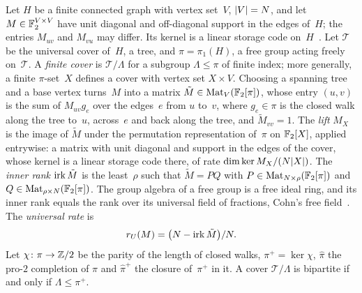 Let $H$ be a finite connected graph with vertex set~$V$, $\lvert V \rvert=N$, and let $M\in\mathbb{F}_2^{V\times V}$ have unit diagonal and
off-diagonal support in the edges of~$H$; the entries $M_{uv}$ and $M_{vu}$ may differ. Its kernel is a linear storage code
on~$H$~\cite[Lemma~6.14]{FourthPaper2026}. Let $\mathcal T$ be the universal cover of~$H$, a tree, and $\pi=\pi_1(H)$, a free
group acting freely on~$\mathcal T$. A \emph{finite cover} is $\mathcal T/\Lambda$ for a subgroup $\Lambda\le\pi$ of finite
index; more generally, a finite $\pi$-set~$X$ defines a cover with vertex set $X\times V$. Choosing a spanning tree and a base
vertex turns~$M$ into a matrix $\tilde M\in\mathrm{Mat}_V(\mathbb{F}_2[\pi])$, whose entry $(u,v)$ is the sum of $M_{uv}g_e$ over the
edges~$e$ from $u$ to~$v$, where $g_e\in\pi$ is the closed walk along the tree to~$u$, across~$e$ and back along the tree, and
$\tilde M_{vv}=1$. The \emph{lift} $M_X$ is the image of $\tilde M$ under the permutation representation of~$\pi$ on
$\mathbb{F}_2[X]$, applied entrywise: a matrix with unit diagonal and support in the edges of the cover, whose kernel is a linear
storage code there, of rate $\dim\ker M_X/(N\lvert X \rvert)$. The \emph{inner rank} $\operatorname{irk}\tilde M$ is the least~$\rho$ such that
$\tilde M=PQ$ with $P\in\mathrm{Mat}_{N\times\rho}(\mathbb{F}_2[\pi])$ and $Q\in\mathrm{Mat}_{\rho\times N}(\mathbb{F}_2[\pi])$. The group algebra
of a free group is a free ideal ring, and its inner rank equals the rank over its universal field of fractions, Cohn's free
field~\cite{Cohn2006}. The \emph{universal rate} is
\[
  r_U(M)=\bigl(N-\operatorname{irk}\tilde M\bigr)/N .
\]
Let $\chi\colon\pi\to\mathbb{Z}/2$ be the parity of the length of closed walks, $\pi^+=\ker\chi$, $\hat\pi$ the pro-$2$ completion of
$\pi$ and $\hat\pi^+$ the closure of~$\pi^+$ in it. A cover $\mathcal T/\Lambda$ is bipartite if and only if $\Lambda\le\pi^+$.

